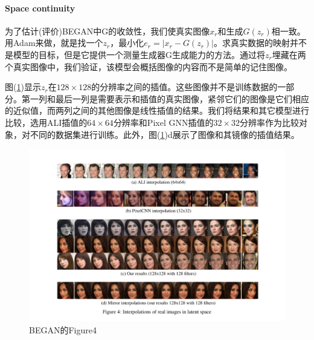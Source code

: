             \paragraph{Space continuity} 为了估计(评价)BEGAN中G的收敛性，我们使真实图像$x_r$和生成$G(z_r)$相一致。用Adam来做，就是找一个$z_r$，最小化$e_r = |x_r - G(z_r)|$。求真实数据的映射并不是模型的目标，但是它提供一个测量生成器G生成能力的方法。通过将$z_r$埋藏在两个真实图像中，我们验证，该模型会概括图像的内容而不是简单的记住图像。
            \par
            图(\ref{fig:BEGAN的Figure4})显示$z_r$在$128\times 128$的分辨率之间的插值。这些图像并不是训练数据的一部分。第一列和最后一列是需要表示和插值的真实图像，紧邻它们的图像是它们相应的近似值，而两列之间的其他图像是线性插值的结果。我们将结果和其它模型进行比较，选用ALI插值的$64\times 64$分辨率和Pixel GNN插值的$32\times 32$分辨率作为比较对象，对不同的数据集进行训练。此外，图(\ref{fig:BEGAN的Figure4})d展示了图像和其镜像的插值结果。
                \begin{figure}[H]
                \centering
                \includegraphics[width=12cm]{images/BEGAN_Figure4.jpg}
                \caption{BEGAN的Figure4}
                \label{fig:BEGAN的Figure4}
                \end{figure}
